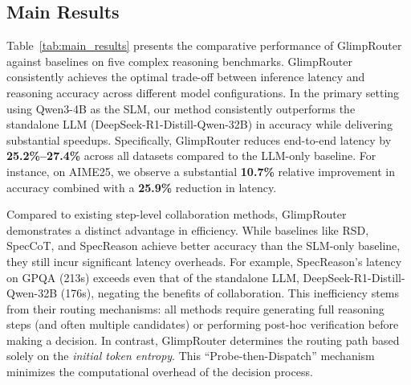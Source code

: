 \documentclass[11pt]{article}
\newcommand{\todoc}[2]{{\textcolor{#1}{{[#2]}}}}
\newcommand{\todoviolet}[1]{\todoc{violet}{\textbf{#1}}}
\newcommand{\zeng}[1]{\textcolor[rgb]{1,0.66,0}{\textbf{[Zeng: #1]}}}
\newcommand{\shi}[1]{\todoviolet{Shi: #1}}
\newcommand{\approach}{{GlimpRouter}\xspace}
\begin{document}
\subsection{Main Results}
\label{sec:main_results}

Table~\ref{tab:main_results} presents the comparative performance of \approach against baselines on five complex reasoning benchmarks. 
\approach consistently achieves the optimal trade-off between inference latency and reasoning accuracy across different model configurations. In the primary setting using Qwen3-4B as the SLM, our method consistently outperforms the standalone LLM (DeepSeek-R1-Distill-Qwen-32B) in accuracy while delivering substantial speedups.
Specifically, \approach reduces end-to-end latency by \textbf{25.2\%--27.4\%} across all datasets compared to the LLM-only baseline. 
For instance, on AIME25, we observe a substantial \textbf{10.7\%} relative improvement in accuracy combined with a \textbf{25.9\%} reduction in latency. 


Compared to existing step-level collaboration methods, \approach demonstrates a distinct advantage in efficiency.
While baselines like RSD, SpecCoT, and SpecReason achieve better accuracy than the SLM-only baseline, they still incur significant latency overheads. 
For example, SpecReason's latency on GPQA (213s) exceeds even that of the standalone LLM, DeepSeek-R1-Distill-Qwen-32B (176s), negating the benefits of collaboration.
This inefficiency stems from their routing mechanisms: all methods require generating full reasoning steps (and often multiple candidates) or performing post-hoc verification before making a decision.
In contrast, \approach determines the routing path based solely on the \textit{initial token entropy}. This ``Probe-then-Dispatch'' mechanism minimizes the computational overhead of the decision process. %
\end{document}
